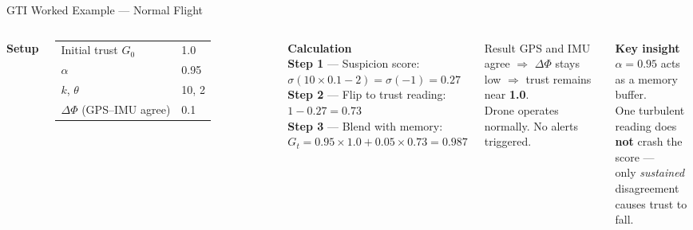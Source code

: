 \documentclass[11pt]{beamer}
\begin{document}
\begin{frame}{GTI Worked Example — Normal Flight}
\begin{columns}[c]
\textbf{\footnotesize Setup}\\[1mm]
\scriptsize
\begin{tabular}{@{}ll@{}}
\toprule
Initial trust $G_0$ & 1.0 \\
$\alpha$ & 0.95 \\
$k$, $\theta$ & 10, 2 \\
$\Delta\Phi$ (GPS--IMU agree) & 0.1 \\
\bottomrule
\end{tabular}
\vspace{3mm}

\textbf{\footnotesize Calculation}\\[1mm]
\scriptsize
\textbf{Step 1} — Suspicion score:\\
$\sigma(10 \times 0.1 - 2) = \sigma(-1) = 0.27$\\[2mm]
\textbf{Step 2} — Flip to trust reading:\\
$1 - 0.27 = 0.73$\\[2mm]
\textbf{Step 3} — Blend with memory:\\
$G_t = 0.95 \times 1.0 + 0.05 \times 0.73 = \mathbf{0.987}$

\begin{block}{\footnotesize Result}
\scriptsize
GPS and IMU agree $\Rightarrow$ $\Delta\Phi$ stays low $\Rightarrow$
trust remains near \textbf{1.0}.\\[2mm]
Drone operates normally. No alerts triggered.
\end{block}
\vspace{3mm}
\textbf{\footnotesize Key insight}\\[1mm]
\scriptsize
$\alpha = 0.95$ acts as a memory buffer.\\
One turbulent reading does \textbf{not} crash the score —\\
only \textit{sustained} disagreement causes trust to fall.
\end{columns}
\end{frame}
\end{document}

